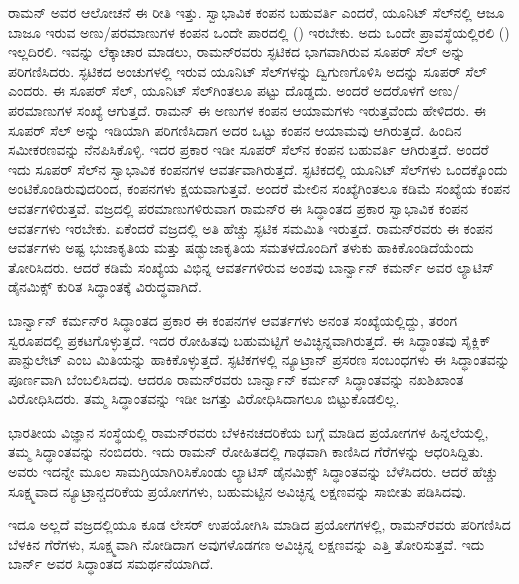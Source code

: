 ರಾಮನ್ ಅವರ ಆಲೋಚನೆ ಈ ರೀತಿ ಇತ್ತು. ಸ್ವಾಭಾವಿಕ ಕಂಪನ ಬಹುವರ್ತಿ ಎಂದರೆ, ಯೂನಿಟ್ ಸೆಲ್‍ನಲ್ಲಿ ಆಜೂ ಬಾಜೂ ಇರುವ ಅಣು/ಪರಮಾಣುಗಳ ಕಂಪನ ಒಂದೇ ಪಾರದಲ್ಲಿ () ಇರಬೇಕು. ಅದು ಒಂದೇ ಪ್ರಾವಸ್ಥೆಯಲ್ಲಿರಲಿ () ಇಲ್ಲದಿರಲಿ. ಇವನ್ನು ಲೆಕ್ಕಾಚಾರ ಮಾಡಲು, ರಾಮನ್‍ರವರು ಸ್ಫಟಿಕದ ಭಾಗವಾಗಿರುವ ಸೂಪರ್ ಸೆಲ್ ಅನ್ನು ಪರಿಗಣಿಸಿದರು. ಸ್ಫಟಿಕದ ಅಂಚುಗಳಲ್ಲಿ ಇರುವ ಯೂನಿಟ್ ಸೆಲ್‍ಗಳನ್ನು ದ್ವಿಗುಣಗೊಳಿಸಿ ಅದನ್ನು ಸೂಪರ್ ಸೆಲ್ ಎಂದರು. ಈ ಸೂಪರ್ ಸೆಲ್, ಯೂನಿಟ್ ಸೆಲ್‍ಗಿಂತಲೂ  ಪಟ್ಟು ದೊಡ್ಡದು. ಅಂದರೆ ಅದರೊಳಗೆ ಅಣು/ಪರಮಾಣುಗಳ ಸಂಖ್ಯೆ  ಆಗುತ್ತದೆ. ರಾಮನ್ ಈ  ಅಣುಗಳ ಕಂಪನ ಆಯಾಮಗಳು  ಇರುತ್ತವೆಂದು ಹೇಳಿದರು. ಈ ಸೂಪರ್ ಸೆಲ್ ಅನ್ನು ಇಡಿಯಾಗಿ ಪರಿಗಣಿಸಿದಾಗ ಅದರ ಒಟ್ಟು ಕಂಪನ ಆಯಾಮವು  ಆಗಿರುತ್ತದೆ. ಹಿಂದಿನ ಸಮೀಕರಣವನ್ನು ನೆನಪಿಸಿಕೊಳ್ಳಿ. ಇದರ ಪ್ರಕಾರ ಇಡೀ ಸೂಪರ್ ಸೆಲ್‍ನ ಕಂಪನ ಬಹುವರ್ತಿ  ಆಗಿರುತ್ತದೆ. ಅಂದರೆ ಇದು ಸೂಪರ್ ಸೆಲ್‍ನ ಸ್ವಾಭಾವಿಕ ಕಂಪನಗಳ ಆವರ್ತವಾಗಿರುತ್ತದೆ. ಸ್ಫಟಿಕದಲ್ಲಿ ಯೂನಿಟ್ ಸೆಲ್‍ಗಳು ಒಂದಕ್ಕೊಂದು ಅಂಟಿಕೊಂಡಿರುವುದರಿಂದ, ಕಂಪನಗಳು ಕ್ಷಯವಾಗುತ್ತವೆ. ಅಂದರೆ ಮೇಲಿನ ಸಂಖ್ಯೆಗಿಂತಲೂ ಕಡಿಮೆ ಸಂಖ್ಯೆಯ ಕಂಪನ ಆವರ್ತಗಳಿರುತ್ತವೆ. ವಜ್ರದಲ್ಲಿ  ಪರಮಾಣುಗಳಿರುವಾಗ ರಾಮನ್‍ರ ಈ ಸಿದ್ಧಾಂತದ ಪ್ರಕಾರ  ಸ್ವಾಭಾವಿಕ ಕಂಪನ ಆವರ್ತಗಳು ಇರಬೇಕು. ಏಕೆಂದರೆ ವಜ್ರದಲ್ಲಿ ಅತಿ ಹೆಚ್ಚು ಸ್ಫಟಿಕ ಸಮಮಿತಿ ಇರುತ್ತದೆ. ರಾಮನ್‍ರವರು ಈ ಕಂಪನ ಆವರ್ತಗಳು ಅಷ್ಟ ಭುಜಾಕೃತಿಯ ಮತ್ತು ಷಡ್ಭುಜಾಕೃತಿಯ ಸಮತಳದೊಂದಿಗೆ ತಳುಕು ಹಾಕಿಕೊಂಡಿದೆಯೆಂದು ತೋರಿಸಿದರು. ಆದರೆ ಕಡಿಮೆ ಸಂಖ್ಯೆಯ ವಿಭಿನ್ನ ಆವರ್ತಗಳಿರುವ ಅಂಶವು ಬಾರ್ನ್\enginline{-}ವಾನ್ ಕಮರ್ನ್ ಅವರ ಲ್ಯಾಟಿಸ್ ಡೈನಮಿಕ್ಸ್ ಕುರಿತ ಸಿದ್ಧಾಂತಕ್ಕೆ ವಿರುದ್ಧವಾಗಿದೆ.

ಬಾರ್ನ್\enginline{-}ವಾನ್ ಕರ್ಮನ್‍ರ ಸಿದ್ಧಾಂತದ ಪ್ರಕಾರ ಈ ಕಂಪನಗಳ ಆವರ್ತಗಳು ಅನಂತ ಸಂಖ್ಯೆಯಲ್ಲಿದ್ದು, ತರಂಗ ಸ್ವರೂಪದಲ್ಲಿ ಪ್ರಕಟಗೊಳ್ಳುತ್ತದೆ. ಇದರ ರೋಹಿತವು ಬಹುಮಟ್ಟಿಗೆ ಅವಿಚ್ಛಿನ್ನವಾಗಿರುತ್ತದೆ. ಈ ಸಿದ್ಧಾಂತವು ಸೈಕ್ಲಿಕ್ ಪಾಸ್ಟುಲೇಟ್ ಎಂಬ ಮಿತಿಯನ್ನು ಹಾಕಿಕೊಳ್ಳುತ್ತದೆ. ಸ್ಫಟಿಕಗಳಲ್ಲಿ ನ್ಯೂಟ್ರಾನ್ ಪ್ರಸರಣ ಸಂಬಂಧಗಳು ಈ ಸಿದ್ಧಾಂತವನ್ನು ಪೂರ್ಣವಾಗಿ ಬೆಂಬಲಿಸಿದವು. ಆದರೂ ರಾಮನ್‍ರವರು ಬಾರ್ನ್\enginline{-}ವಾನ್ ಕರ್ಮನ್ ಸಿದ್ಧಾಂತವನ್ನು ನಖಶಿಖಾಂತ ವಿರೋಧಿಸಿದರು. ತಮ್ಮ ಸಿದ್ಧಾಂತವನ್ನು ಇಡೀ ಜಗತ್ತು ವಿರೋಧಿಸಿದಾಗಲೂ ಬಿಟ್ಟುಕೊಡಲಿಲ್ಲ.

ಭಾರತೀಯ ವಿಜ್ಞಾನ ಸಂಸ್ಥೆಯಲ್ಲಿ ರಾಮನ್‍ರವರು ಬೆಳಕಿನ\enginline{-}ಚದರಿಕೆಯ ಬಗ್ಗೆ ಮಾಡಿದ ಪ್ರಯೋಗಗಳ ಹಿನ್ನಲೆಯಲ್ಲಿ, ತಮ್ಮ ಸಿದ್ಧಾಂತವನ್ನು ನಂಬಿದರು. ಇದು ರಾಮನ್ ರೋಹಿತದಲ್ಲಿ\break {} ಗಾಢವಾಗಿ ಕಾಣಿಸಿದ ಗೆರೆಗಳನ್ನು ಆಧರಿಸಿದ್ದಿತು. ಅವರು ಇದನ್ನೇ ಮೂಲ ಸಾಮಗ್ರಿಯಾಗಿರಿಸಿಕೊಂಡು ಲ್ಯಾಟಿಸ್ ಡೈನಮಿಕ್ಸ್ ಸಿದ್ಧಾಂತವನ್ನು ಬೆಳೆಸಿದರು. ಆದರೆ ಹೆಚ್ಚು ಸೂಕ್ಷ್ಮವಾದ ನ್ಯೂಟ್ರಾನ್\enginline{-}ಚದರಿಕೆಯ ಪ್ರಯೋಗಗಳು, ಬಹುಮಟ್ಟಿನ ಅವಿಚ್ಛಿನ್ನ ಲಕ್ಷಣವನ್ನು ಸಾಬೀತು ಪಡಿಸಿದವು.

ಇದೂ ಅಲ್ಲದೆ ವಜ್ರದಲ್ಲಿಯೂ ಕೂಡ ಲೇಸರ್ ಉಪಯೋಗಿಸಿ ಮಾಡಿದ ಪ್ರಯೋಗಗಳಲ್ಲಿ, ರಾಮನ್‍ರವರು ಪರಿಗಣಿಸಿದ ಬೆಳಕಿನ ಗೆರೆಗಳು, ಸೂಕ್ಷ್ಮವಾಗಿ ನೋಡಿದಾಗ ಅವುಗಳೊಡಗಣ ಅವಿಚ್ಛಿನ್ನ ಲಕ್ಷಣವನ್ನು ಎತ್ತಿ ತೋರಿಸುತ್ತವೆ. ಇದು ಬಾರ್ನ್ ಅವರ ಸಿದ್ಧಾಂತದ ಸಮರ್ಥನೆಯಾಗಿದೆ.

